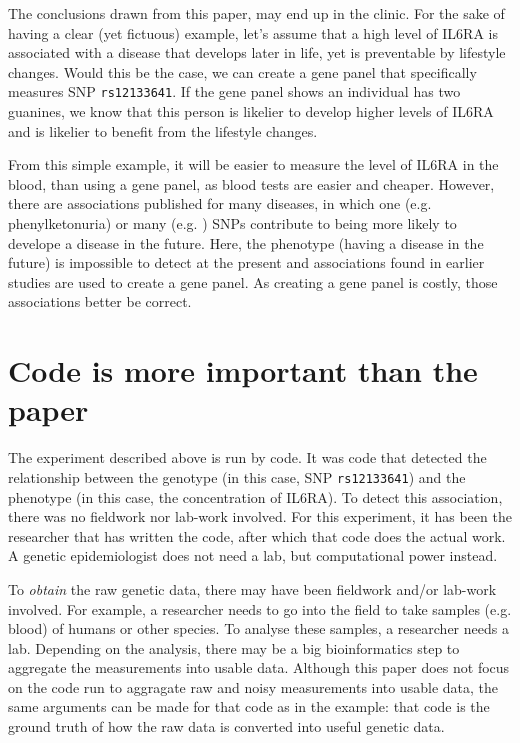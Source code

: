The conclusions drawn from this paper,
may end up in the clinic.
For the sake of having a clear (yet fictuous) example,
let's assume that a high level of IL6RA 
is associated with a disease that develops later in life,
yet is preventable by lifestyle changes.
Would this be the case, we can create a gene panel that specifically measures
SNP \verb|rs12133641|. 
If the gene panel shows an individual has two guanines, 
we know that this person is likelier to develop higher levels of
IL6RA and is likelier to benefit from the lifestyle changes.

From this simple example, it will be easier
to measure the level of IL6RA in the blood, than using a gene panel,
as blood tests are easier and cheaper.
However, there are associations published for many diseases,
in which one (e.g. phenylketonuria) or many (e.g. \cite{bruce2009metabolic}) 
SNPs contribute to being more likely to develope a disease in the future. 
Here, the phenotype (having a disease in the future) 
is impossible to detect at the present
and associations found in earlier studies are used to create a gene panel.
As creating a gene panel is costly, those associations better be correct.

\section{Code is more important than the paper}


The experiment described above is run by code. 
It was code that detected the relationship between the genotype
(in this case, SNP \verb|rs12133641|) 
and the phenotype (in this case, the concentration of IL6RA).
To detect this association, 
there was no fieldwork nor lab-work involved.
For this experiment, 
it has been the researcher that has written the code,
after which that code does the actual work. 
A genetic epidemiologist does not need a lab, but computational power instead.

To \emph{obtain} the raw genetic data, there may have been fieldwork and/or lab-work
involved. For example, a researcher needs to go into the field to take
samples (e.g. blood) of humans or other species. 
To analyse these samples,
a researcher needs a lab. 
Depending on the analysis, there may be a big bioinformatics step
to aggregate the measurements into usable data. 
Although this paper does not focus on the code run to 
aggragate raw and noisy measurements into usable data, the same arguments
can be made for that code as in the example: that code is 
the ground truth of how the raw data is converted into useful genetic data.

